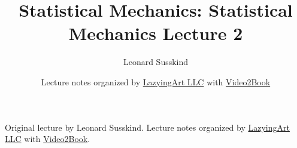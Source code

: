 \documentclass[11pt,oneside]{book}
\begin{document}
\frontmatter
\title{Statistical Mechanics: Statistical Mechanics Lecture 2}
\author{Leonard Susskind}
\date{Lecture notes organized by \href{https://lazying.art}{LazyingArt LLC} with \href{https://github.com/lachlanchen/Video2Book}{Video2Book}}
\maketitle
\begin{center}
\small Original lecture by Leonard Susskind. Lecture notes organized by \href{https://lazying.art}{LazyingArt LLC} with \href{https://github.com/lachlanchen/Video2Book}{Video2Book}.
\end{center}
\clearpage
\mainmatter

\end{document}
